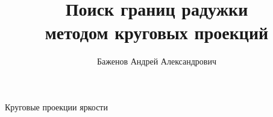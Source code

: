 \documentclass{beamer}
\title{Поиск границ радужки\\ методом круговых проекций}
\author[А.\,А. Баженов]{Баженов Андрей Александрович}
\institute{Московский физико-технический институт}
\date{\footnotesize
\par\smallskip\emph{Курс:} Автоматизация научных исследований\par (практика, В.\,В.~Стрижов)/Группа 821
\par\smallskip\emph{Эксперт:} И.\,А.~Матвеев
\par\smallskip\emph{Консультант:} И.\,А.~Матвеев
\par\bigskip\small 2021}
\begin{document}
\begin{frame}
\thispagestyle{empty}
\maketitle
\end{frame}
\begin{frame}{Круговые проекции яркости}


\end{frame}
\end{document}
